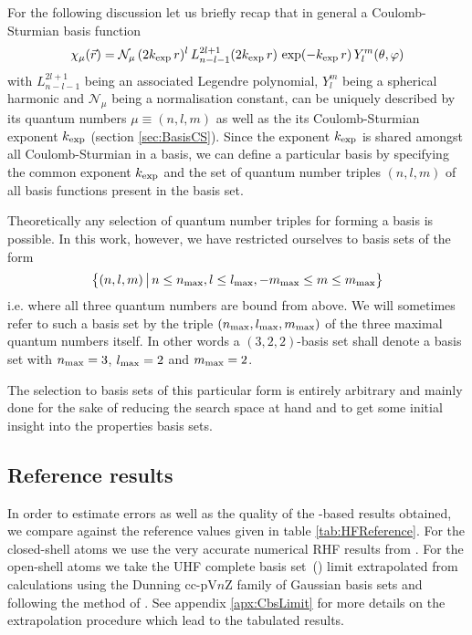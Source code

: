 \newcommand{\nmax}{\ensuremath n_\text{max}}
\newcommand{\lmax}{\ensuremath l_\text{max}}
\newcommand{\mmax}{\ensuremath m_\text{max}}
For the following discussion let us briefly recap
that in general a Coulomb-Sturmian basis function
\begin{equation}
\chi_\mu(\vec{r}) = \mathcal{N}_\mu \,
	(2 k_\text{exp} \, r)^l \,
	L^{2l+1}_{n-l-1}(2 k_\text{exp} \, r) \,
	\exp(- k_\text{exp} \, r) \,
	Y_l^m(\theta, \varphi)
	\label{eqn:FormCSBasisFunction}
\end{equation}
with $L^{2l+1}_{n-l-1}$ being an associated Legendre polynomial,
$Y_l^m$ being a spherical harmonic and $\mathcal{N}_\mu$ being a normalisation
constant,
can be uniquely described by its quantum numbers $\mu \equiv (n,l,m)$
as well as the its Coulomb-Sturmian exponent $k_\text{exp}$ (\cf section \vref{sec:BasisCS}).
Since the exponent $k_\text{exp}$ is shared amongst all Coulomb-Sturmian in a basis,
we can define a particular \CS basis
by specifying the common exponent $k_\text{exp}$
and the set of quantum number triples $(n, l, m)$ of all \CS basis functions
present in the basis set.

Theoretically any selection of quantum number triples for forming a basis
is possible.
In this work, however, we have restricted ourselves to basis sets of the form
\[ \big\{ (n, l, m) \, \big| \, n \le \nmax, l \le \lmax, -\mmax \le m \le \mmax \big\} \]
i.e. where all three quantum numbers are bound from above.
We will sometimes refer to such a \CS basis set by the triple
$(\nmax, \lmax, \mmax)$ of the three maximal quantum numbers itself.
In other words a $(3,2,2)$-basis set shall denote a basis set with
$\nmax = 3$, $\lmax = 2$ and $\mmax = 2$.

The selection to basis sets of this particular form is entirely arbitrary
and mainly done for the sake of reducing the search space at hand
and to get some initial insight into the properties \CS basis sets.

\subsection{Reference results}
\defineabbr{CBS}{CBS\xspace}{complete basis set limit}

In order to estimate errors as well as the quality of the \CS-based \HF
results obtained,
we compare against the reference values given in table \vref{tab:HFReference}.
For the closed-shell atoms we use the very accurate numerical RHF results
from \citet{Morgon1997}.
For the open-shell atoms we take the UHF complete basis set~(\CBS)
limit extrapolated from calculations using the Dunning cc-pV$n$Z family
of Gaussian basis sets and following the method of \citet{Jensen2005}.
See appendix \vref{apx:CbsLimit} for more details on the extrapolation
procedure which lead to the tabulated results.



